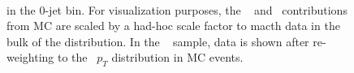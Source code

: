 \begin{figure}[!hbtp]
\begin{center}
\\
\caption{\met in the 0-jet bin. 
For visualization purposes, the \gjets~ and \dyll~contributions from MC are scaled by a had-hoc scale factor to macth data in the bulk of the distribution.
In the \gjets~ sample, data is shown after re-weighting to the \dyll~$p_T$ distribution in MC events.}
\label{fig:met_0j}
\end{center}
\end{figure}

